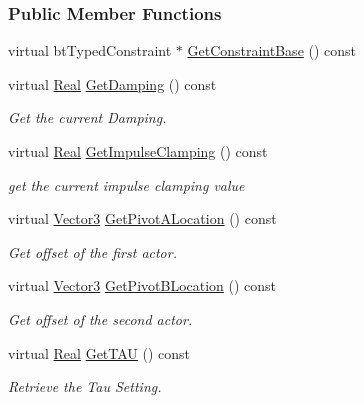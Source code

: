 \subsubsection*{Public Member Functions}
\begin{DoxyCompactItemize}
\item 
virtual btTypedConstraint $\ast$ \hyperlink{classphys_1_1Point2PointConstraint_afc714f85fa0c26d8520cd72e73a0b199}{GetConstraintBase} () const 
\item 
virtual \hyperlink{namespacephys_af7eb897198d265b8e868f45240230d5f}{Real} \hyperlink{classphys_1_1Point2PointConstraint_a273576b756d2beca5345a2c85d6b0098}{GetDamping} () const 
\begin{DoxyCompactList}\small\item\em Get the current Damping. \item\end{DoxyCompactList}\item 
virtual \hyperlink{namespacephys_af7eb897198d265b8e868f45240230d5f}{Real} \hyperlink{classphys_1_1Point2PointConstraint_a2ff8bcbf428b6a3d475dc36f13b28b52}{GetImpulseClamping} () const 
\begin{DoxyCompactList}\small\item\em get the current impulse clamping value \item\end{DoxyCompactList}\item 
virtual \hyperlink{classphys_1_1Vector3}{Vector3} \hyperlink{classphys_1_1Point2PointConstraint_a97009ed12b23028241a59e602dc63e38}{GetPivotALocation} () const 
\begin{DoxyCompactList}\small\item\em Get offset of the first actor. \item\end{DoxyCompactList}\item 
virtual \hyperlink{classphys_1_1Vector3}{Vector3} \hyperlink{classphys_1_1Point2PointConstraint_a478b2fc6019b6c0fe57ef41e323b5e63}{GetPivotBLocation} () const 
\begin{DoxyCompactList}\small\item\em Get offset of the second actor. \item\end{DoxyCompactList}\item 
virtual \hyperlink{namespacephys_af7eb897198d265b8e868f45240230d5f}{Real} \hyperlink{classphys_1_1Point2PointConstraint_a9b5ccfef074f8c8df18455f2690c1cd1}{GetTAU} () const 
\begin{DoxyCompactList}\small\item\em Retrieve the Tau Setting. \item\end{DoxyCompactList}\item 

\end{DoxyCompactItemize}

